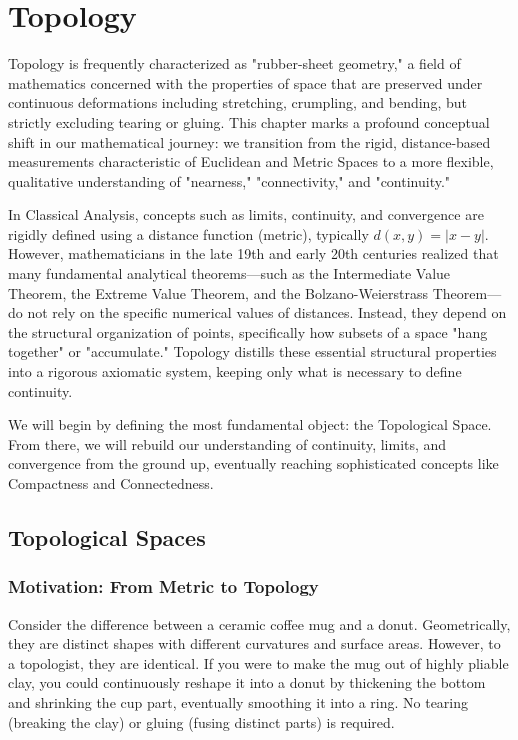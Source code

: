 \chapter{Topology}

Topology is frequently characterized as "rubber-sheet geometry," a field of mathematics concerned with the properties of space that are preserved under continuous deformations including stretching, crumpling, and bending, but strictly excluding tearing or gluing. This chapter marks a profound conceptual shift in our mathematical journey: we transition from the rigid, distance-based measurements characteristic of Euclidean and Metric Spaces to a more flexible, qualitative understanding of "nearness," "connectivity," and "continuity."

In Classical Analysis, concepts such as limits, continuity, and convergence are rigidly defined using a distance function (metric), typically $d(x, y) = |x - y|$. However, mathematicians in the late 19th and early 20th centuries realized that many fundamental analytical theorems---such as the Intermediate Value Theorem, the Extreme Value Theorem, and the Bolzano-Weierstrass Theorem---do not rely on the specific numerical values of distances. Instead, they depend on the structural organization of points, specifically how subsets of a space "hang together" or "accumulate." Topology distills these essential structural properties into a rigorous axiomatic system, keeping only what is necessary to define continuity.

We will begin by defining the most fundamental object: the Topological Space. From there, we will rebuild our understanding of continuity, limits, and convergence from the ground up, eventually reaching sophisticated concepts like Compactness and Connectedness.

\section{Topological Spaces}

\subsection{Motivation: From Metric to Topology}

Consider the difference between a ceramic coffee mug and a donut. Geometrically, they are distinct shapes with different curvatures and surface areas. However, to a topologist, they are identical. If you were to make the mug out of highly pliable clay, you could continuously reshape it into a donut by thickening the bottom and shrinking the cup part, eventually smoothing it into a ring. No tearing (breaking the clay) or gluing (fusing distinct parts) is required.

